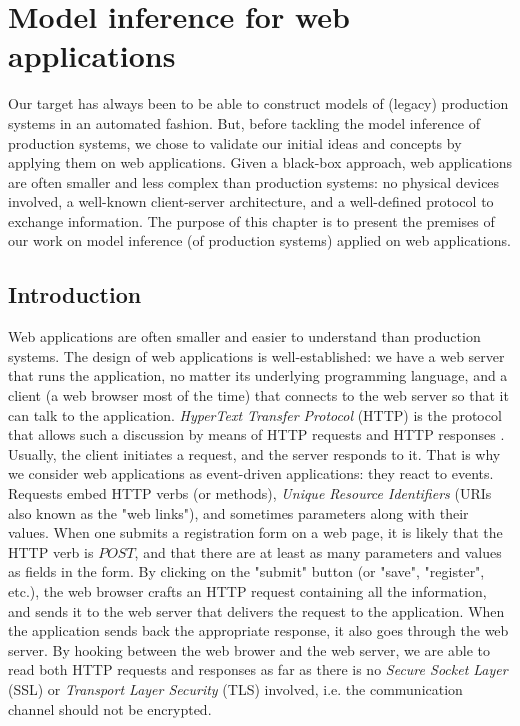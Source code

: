 \chapter{Model inference for web applications}
\label{sec:modelinf:webapps}

Our target has always been to be able to construct models of
(legacy) production systems in an automated fashion. But, before
tackling the model inference of production systems, we chose to
validate our initial ideas and concepts by applying them on web
applications. Given a black-box approach, web applications are
often smaller and less complex than production systems: no
physical devices involved, a well-known client-server
architecture, and a well-defined protocol to exchange
information. The purpose of this chapter is to present the
premises of our work on model inference (of production systems)
applied on web applications.\\

\minitoc

\section{Introduction}

Web applications are often smaller and easier to understand than
production systems. The design of web applications is
well-established: we have a web server that runs the application,
no matter its underlying programming language, and a client (a
web browser most of the time) that connects to the web server so
that it can talk to the application. \textit{HyperText Transfer
Protocol} (HTTP)  is the protocol that allows such a discussion by
means of HTTP requests and HTTP responses \cite{RFC7230}.
Usually, the client initiates a request, and the server responds
to it. That is why we consider web applications as event-driven
applications: they react to events. Requests embed HTTP verbs (or
methods), \textit{Unique Resource Identifiers} (URIs also known
as the "web links"), and sometimes parameters along with their
values. When one submits a registration form on a web page, it is
likely that the HTTP verb is $POST$, and that there are at least
as many parameters and values as fields in the form. By clicking
on the "submit" button (or "save", "register", etc.), the web
browser crafts an HTTP request containing all the information,
and sends it to the web server that delivers the request to the
application. When the application sends back the appropriate
response, it also goes through the web server. By hooking between
the web brower and the web server, we are able to read both HTTP
requests and responses as far as there is no \textit{Secure
Socket Layer} (SSL) or \textit{Transport Layer Security} (TLS)
involved, i.e. the communication channel should not be encrypted.

